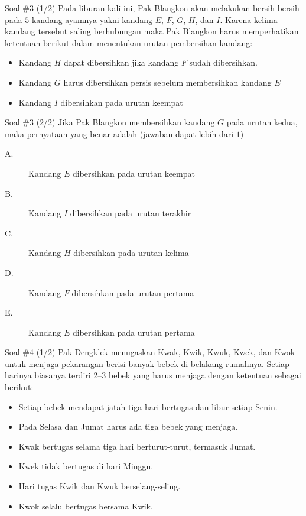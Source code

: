 \documentclass[english,t]{beamer}
\begin{document}
	\begin{frame}{Soal \#3 (1/2)} 
		Pada liburan kali ini, Pak Blangkon akan melakukan bersih-bersih pada $5$ kandang ayamnya yakni kandang $E$, $F$, $G$, $H$, dan $I$. Karena kelima kandang tersebut saling berhubungan maka Pak Blangkon harus memperhatikan ketentuan berikut dalam menentukan urutan pembersihan kandang:
		\begin{itemize}
			\item Kandang $H$ dapat dibersihkan jika kandang $F$ sudah dibersihkan.
			\item Kandang $G$ harus dibersihkan persis sebelum membersihkan kandang $E$
			\item Kandang $I$ dibersihkan pada urutan keempat
		\end{itemize}		
	\end{frame}

	\begin{frame}{Soal \#3 (2/2)} 
		Jika Pak Blangkon membersihkan kandang $G$ pada urutan kedua, maka pernyataan yang benar adalah (jawaban dapat lebih dari $1$)
		\begin{description}
			\item[A.] Kandang $E$ dibersihkan pada urutan keempat
			\item[B.] Kandang $I$ dibersihkan pada urutan terakhir
			\item[C.] Kandang $H$ dibersihkan pada urutan kelima
			\item[D.] Kandang $F$ dibersihkan pada urutan pertama
			\item[E.] Kandang $E$ dibersihkan pada urutan pertama
		\end{description}
	\end{frame}


	\begin{frame}{Soal \#4 (1/2)}
		Pak Dengklek menugaskan Kwak, Kwik, Kwuk, Kwek, dan Kwok untuk menjaga pekarangan berisi banyak bebek di belakang rumahnya. Setiap harinya biasanya terdiri 2--3 bebek yang harus menjaga dengan ketentuan sebagai berikut:
		\begin{itemize}
			\item Setiap bebek mendapat jatah tiga hari bertugas dan libur setiap Senin.
			\item Pada Selasa dan Jumat harus ada tiga bebek yang menjaga.
			\item Kwak bertugas selama tiga hari berturut-turut, termasuk Jumat.
			\item Kwek tidak bertugas di hari Minggu.
			\item Hari tugas Kwik dan Kwuk berselang-seling.
			\item Kwok selalu bertugas bersama Kwik.
		\end{itemize}
	\end{frame}
\end{document}
